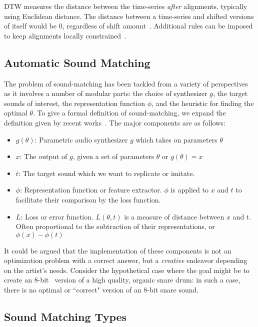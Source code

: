 \documentclass[lettersize,journal]{IEEEtran}
\newcommand{\highlight}[1]{\textcolor[RGB]{00,100,100}{#1}}
\begin{document}
DTW measures the distance between the time-series \textit{after} alignments, typically using Euclidean distance. The distance between a time-series and shifted versions of itself would be 0, regardless of shift amount~\cite{tavenard.blog.dtw}. Additional rules can be imposed to keep alignments locally constrained~\cite{itakura1975minimum,sakoe1978dynamic}.

\subsection{Automatic Sound Matching}
\label{sec:sound_matching_definition}
The problem of sound-matching has been tackled from a variety of perspectives as it involves a number of modular parts: the choice of synthesizer $g$, the target sounds of interest, the representation function $\phi$, and the heuristic for finding the optimal $\theta$. To give a formal definition of sound-matching, we expand the definition given by recent works~\cite{vahidi2023mesostructures,han2023perceptual}. The major components are as follows: 
\begin{itemize}
    \item $g(\theta)$: Parametric audio synthesizer $g$ which takes on parameters $\theta$ 
    \item $x$: The output of $g$, given a set of parameters $\theta$ or $g(\theta) = x$ 
    \item $t$: The target sound which we want to replicate or imitate. 
    \item $\phi$: Representation function or feature extractor. $\phi$ is applied to $x$ and $t$ to facilitate their comparison by the loss function.
    \item $L$: Loss or error function. $L(\theta,t)$ is a measure of distance between $x$ and $t$. Often proportional to the subtraction of their representations, or $ \phi(x) - \phi(t)$
\end{itemize}

\highlight{It could be argued that the implementation of these components is not an optimization problem with a correct answer, but a \textit{creative} endeavor depending on the artist's needs}. Consider the hypothetical case where the goal might be to create an 8-bit~\cite{collins2007loop} version of a high quality, organic snare drum: in such a case, there is no optimal or ``correct" version of an 8-bit snare sound. 

\subsection{Sound Matching Types}
\label{sec:matching_types}
\end{document}
